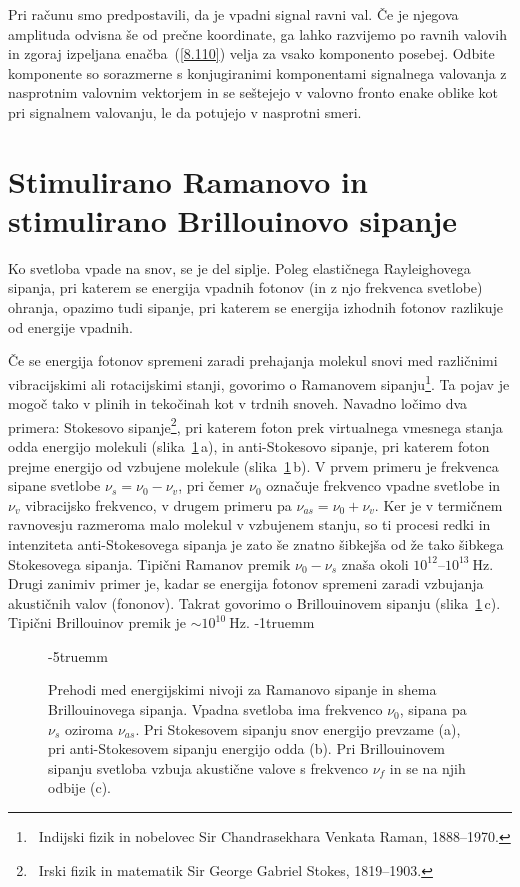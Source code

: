 Pri računu smo predpostavili, da je vpadni signal ravni val. Če je njegova
amplituda odvisna še od prečne koordinate, ga lahko razvijemo po ravnih
valovih in zgoraj izpeljana enačba~(\ref{8.110}) velja za vsako komponento posebej. 
Odbite komponente so sorazmerne s konjugiranimi komponentami signalnega valovanja
z nasprotnim valovnim vektorjem in se seštejejo v valovno fronto enake
oblike kot pri signalnem valovanju, le da potujejo v nasprotni smeri.

\section{Stimulirano Ramanovo in stimulirano Brillouinovo sipanje}
\label{chap:SRS}
Ko svetloba vpade na snov, se je del siplje. Poleg elastičnega Rayleighovega sipanja,
pri katerem se energija vpadnih fotonov (in z njo frekvenca svetlobe) ohranja, opazimo 
tudi sipanje, pri katerem se energija izhodnih fotonov razlikuje od energije 
vpadnih. 

Če se energija fotonov spremeni zaradi prehajanja molekul snovi med različnimi
vibracijskimi ali rotacijskimi stanji, govorimo o Ramanovem
sipanju\footnote{~Indijski fizik in nobelovec Sir Chandrasekhara Venkata Raman, 1888--1970.}. 
Ta pojav je mogoč tako v plinih in tekočinah kot v trdnih snoveh. Navadno 
ločimo dva primera: Stokesovo sipanje\footnote{~Irski fizik in matematik Sir George Gabriel
Stokes, 1819--1903.}, pri katerem foton prek virtualnega vmesnega stanja 
odda energijo molekuli (slika~\ref{08_Raman}\,a),
in anti-Stokesovo sipanje,
pri katerem foton prejme energijo od vzbujene molekule (slika~\ref{08_Raman}\,b).
V prvem primeru je frekvenca
sipane svetlobe $\nu_s=\nu_0-\nu_v$, pri čemer $\nu_0$ označuje frekvenco vpadne
svetlobe in $\nu_v$ vibracijsko frekvenco, v drugem primeru pa $\nu_{as}=\nu_0+\nu_v$.
Ker je v termičnem ravnovesju razmeroma malo molekul v vzbujenem stanju, so ti 
procesi redki in intenziteta anti-Stokesovega sipanja je zato 
še znatno šibkejša od že tako šibkega Stokesovega sipanja. Tipični Ramanov premik 
$\nu_0-\nu_s$ znaša okoli $10^{12}$--$10^{13}~\si{\hertz}$.
Drugi zanimiv primer je, kadar se energija fotonov spremeni zaradi 
vzbujanja akustičnih valov (fononov). Takrat govorimo o Brillouinovem 
sipanju (slika~\ref{08_Raman}\,c).
Tipični Brillouinov premik je $\sim 10^{10}~\si{\hertz}$. 
\vglue-1truemm
\begin{figure}[ht]
\centering
\def\svgwidth{120truemm} 

\caption{Prehodi med energijskimi nivoji za Ramanovo sipanje in shema Brillouinovega sipanja. Vpadna 
svetloba ima frekvenco $\nu_0$, sipana pa $\nu_s$ oziroma $\nu_{as}$. Pri Stokesovem sipanju 
snov energijo prevzame (a), pri anti-Stokesovem sipanju energijo odda (b).
Pri Brillouinovem sipanju svetloba vzbuja akustične valove s frekvenco $\nu_f$ in se na njih odbije (c).}
\label{08_Raman}
\vglue-5truemm
\end{figure}

